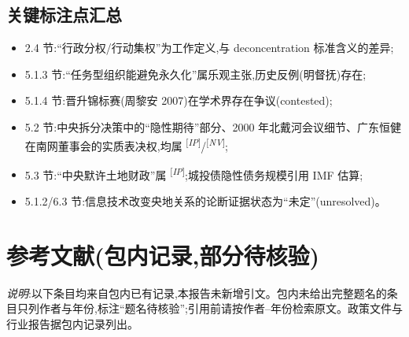 \documentclass[UTF8,12pt,a4paper]{ctexrep}
\newcommand{\src}[1]{\textsuperscript{[\emph{#1}]}}
\begin{document}
\section{关键标注点汇总}

\begin{itemize}
  \item 2.4 节:``行政分权/行动集权''为工作定义,与 deconcentration 标准含义的差异;
  \item 5.1.3 节:``任务型组织能避免永久化''属乐观主张,历史反例(明督抚)存在;
  \item 5.1.4 节:晋升锦标赛(周黎安 2007)在学术界存在争议(contested);
  \item 5.2 节:中央拆分决策中的``隐性期待''部分、2000 年北戴河会议细节、广东恒健在南网董事会的实质表决权,均属 \src{IP}/\src{NV};
  \item 5.3 节:``中央默许土地财政''属 \src{IP};城投债隐性债务规模引用 IMF 估算;
  \item 5.1.2/6.3 节:信息技术改变央地关系的论断证据状态为``未定''(unresolved)。
\end{itemize}

\chapter{参考文献(包内记录,部分待核验)}

\emph{说明}:以下条目均来自包内已有记录,本报告未新增引文。包内未给出完整题名的条目只列作者与年份,标注``题名待核验'';引用前请按作者--年份检索原文。政策文件与行业报告据包内记录列出。
\end{document}
